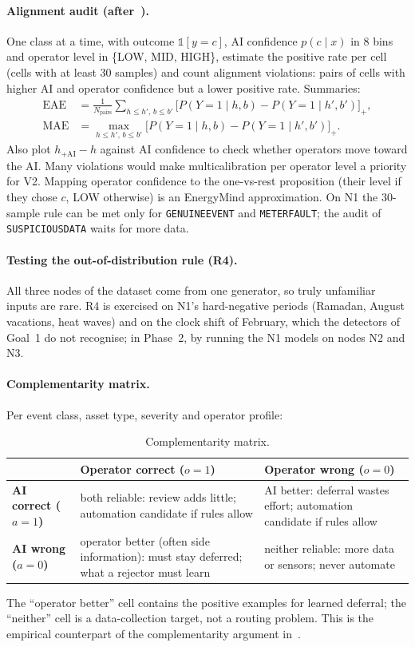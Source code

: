 \documentclass[11pt,a4paper]{article}
\renewcommand{\_}{\textunderscore\allowbreak}
\providecommand{\GE}{\texttt{GENUINE\_EVENT}}
\providecommand{\MF}{\texttt{METER\_FAULT}}
\providecommand{\SD}{\texttt{SUSPICIOUS\_DATA}}
\begin{document}
\paragraph{Alignment audit (after~\cite{benz}).} One class at a time, with outcome $\mathbb 1[y=c]$, AI confidence
$p(c\mid x)$ in 8 bins and operator level in \{LOW, MID, HIGH\}, estimate the positive rate per cell (cells with
at least 30 samples) and count alignment violations: pairs of cells with higher AI and operator confidence but a
lower positive rate. Summaries:
\begin{align}
\mathrm{EAE}&=\frac1{N_{\mathrm{pairs}}}\sum_{h\le h',\,b\le b'}\bigl[P(Y=1\mid h,b)-P(Y=1\mid h',b')\bigr]_+,\\
\mathrm{MAE}&=\max_{h\le h',\,b\le b'}\bigl[P(Y=1\mid h,b)-P(Y=1\mid h',b')\bigr]_+ .
\end{align}
Also plot $h_{+\mathrm{AI}}-h$ against AI confidence to check whether operators move toward the AI. Many violations
would make multicalibration per operator level a priority for V2. Mapping operator confidence to the one-vs-rest
proposition (their level if they chose $c$, LOW otherwise) is an EnergyMind approximation. On N1 the 30-sample
rule can be met only for \GE{} and \MF; the audit of \SD{} waits for more data.

\paragraph{Testing the out-of-distribution rule (R4).} All three nodes of the dataset come from one generator,
so truly unfamiliar inputs are rare. R4 is exercised on N1's hard-negative periods (Ramadan, August vacations,
heat waves) and on the clock shift of February, which the detectors of Goal~1 do not recognise; in Phase~2, by
running the N1 models on nodes N2 and N3.

\paragraph{Complementarity matrix.} Per event class, asset type, severity and operator profile:
\begin{table}[H]
\centering\small
\begin{tabularx}{\textwidth}{@{}>{\raggedright\arraybackslash}p{2.6cm}LL@{}}
\toprule
 & \textbf{Operator correct ($o=1$)} & \textbf{Operator wrong ($o=0$)} \\
\midrule
\textbf{AI correct ($a=1$)} & both reliable: review adds little; automation candidate if rules allow & AI better: deferral wastes effort; automation candidate if rules allow \\
\textbf{AI wrong ($a=0$)} & operator better (often side information): must stay deferred; what a rejector must learn & neither reliable: more data or sensors; never automate \\
\bottomrule
\end{tabularx}
\caption{Complementarity matrix.}
\end{table}
The ``operator better'' cell contains the positive examples for learned deferral; the ``neither'' cell is a
data-collection target, not a routing problem. This is the empirical counterpart of the complementarity argument
in~\cite{mozannar}.
\end{document}
